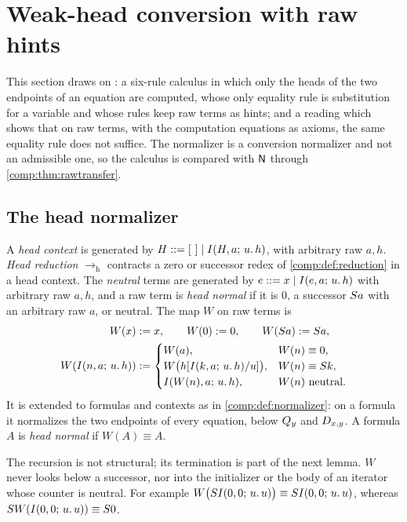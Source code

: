 \section{Weak-head conversion with raw hints}
\label{comp:sec:head}

This section draws on : a six-rule calculus in which
only the heads of the two endpoints of an equation are computed, whose only
equality rule is substitution for a variable and whose rules keep raw terms
as hints; and a reading which shows that on raw terms, with the computation
equations as axioms, the same equality rule does not suffice. The
normalizer is a conversion normalizer and not an admissible one, so the
calculus is compared with $\mathsf{N}$ through \cref{comp:thm:rawtransfer}.

\subsection{The head normalizer}

\begin{definition}
\label{comp:def:whnf}
A \emph{head context} is generated by $H::=[\ ]\mid\It{H}{a}{u}{h}$, with
arbitrary raw $a,h$. \emph{Head reduction} $\to_{\mathrm h}$ contracts a zero
or successor redex of \cref{comp:def:reduction} in a head context. The
\emph{neutral} terms are generated by $e::=x\mid I(e,a;\,u.\,h)$ with
arbitrary raw $a,h$, and a raw term is \emph{head normal} if it is $0$, a
successor $S a$ with an arbitrary raw $a$, or neutral. The map $W$ on raw
terms is
\begin{align*}
 W(x)&\mathrel{:=} x,\qquad W(0)\mathrel{:=}0,\qquad W(S a)\mathrel{:=}S a,\\
 W(I(n,a;\,u.\,h))&\mathrel{:=}
 \begin{cases}
  W(a), & W(n)\equiv0,\\
  W\bigl(h[I(k,a;\,u.\,h)/u]\bigr), & W(n)\equiv S k,\\
  I(W(n),a;\,u.\,h), & W(n)\text{ neutral}.
 \end{cases}
\end{align*}
It is extended to formulas and contexts as in \cref{comp:def:normalizer}: on
a formula it normalizes the two endpoints of every equation, below $Q_{y}$
and $D_{x,y}$. A formula $A$ is \emph{head normal} if $W(A)\equiv A$.
\end{definition}

The recursion is not structural; its termination is part of the next lemma.
$W$ never looks below a successor, nor into the initializer or the body of an
iterator whose counter is neutral. For example
$W\bigl(SI(0,0;\,u.\,u)\bigr)\equiv SI(0,0;\,u.\,u)$, whereas
$S W(I(0,0;\,u.\,u))\equiv S0$.

